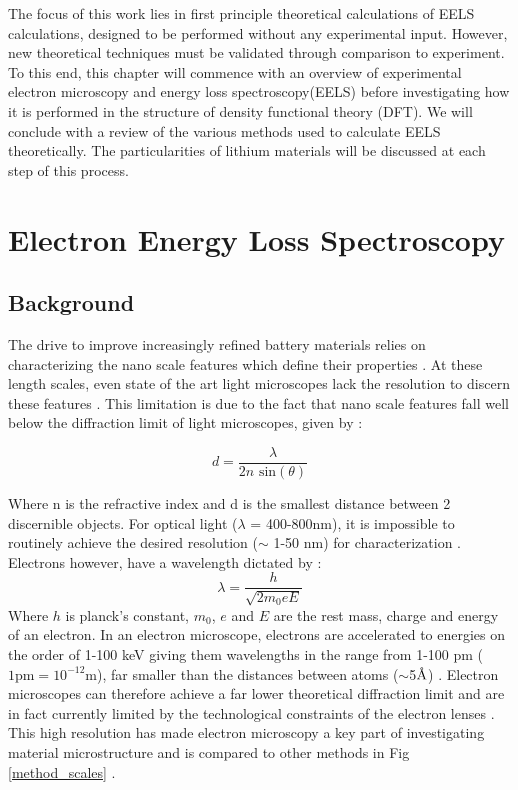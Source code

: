 


The focus of this work lies in  first principle theoretical calculations of EELS calculations, designed to be performed without any experimental input.  However, new theoretical techniques must be validated through comparison to experiment.  To this end, this chapter will commence with an overview of experimental electron microscopy and  energy loss spectroscopy(EELS) before investigating how it is performed in the  structure of density functional theory (DFT). We will conclude with a review of the various methods used to calculate EELS theoretically.  The particularities of lithium materials will be discussed at each step of this process.  
 
\section{Electron Energy Loss Spectroscopy}

\subsection{Background}
The drive to improve increasingly refined battery materials relies on characterizing   the nano scale features which define their properties \cite{goldstein_electron_2003}.  At these length scales, even state of the art light microscopes lack the resolution to discern these features \cite{rust_sub-diffraction-limit_2006}.  This limitation is due to the fact that nano scale features fall well below the diffraction limit of light microscopes, given by \cite{hecht}: 

\begin{equation}
	d = \frac{\lambda}{2n\textrm{ sin}(\theta)}
\end{equation}

Where n is the refractive index and d is the smallest distance between 2 discernible objects. For optical light ($\lambda$ = 400-800nm), it is impossible to routinely achieve the desired resolution ($\sim$ 1-50 nm) for characterization \cite{rust_sub-diffraction-limit_2006}.  Electrons however, have a wavelength dictated by \cite{goldstein_electron_2003}: 
\begin{equation}
 \lambda = \frac{h}{\sqrt{2 m_0 e E}}
\end{equation}
Where $h$ is planck's constant, $m_0$, $e$ and $E$ are the rest mass, charge and energy of an electron.  In an electron microscope, electrons are accelerated to energies on the order of 1-100 keV giving them wavelengths in the range from 1-100 pm ($1\mathrm{pm}=10^{-12}$m), far  smaller than the distances between atoms ($\sim$5$\mbox{\normalfont\AA }$) \cite{morales_laser_1998}.  Electron microscopes can therefore achieve a far lower theoretical diffraction limit  and are in fact currently limited by the technological constraints of the electron  lenses \cite{goldstein_electron_2003}.  This high resolution has made electron microscopy a key part of investigating material microstructure and is compared to other methods  in Fig \ref{method_scales} \cite{inkson_2_2016}. 


